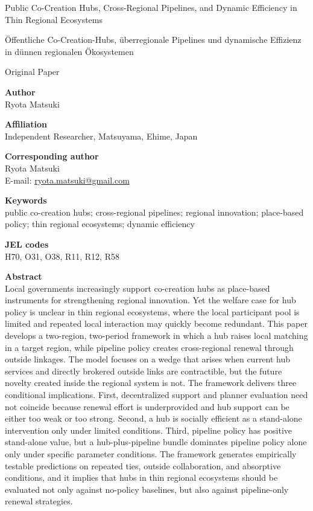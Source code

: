 \documentclass[12pt]{article}
\begin{document}
\begin{center}
{\Large Public Co-Creation Hubs, Cross-Regional Pipelines, and Dynamic Efficiency in Thin Regional Ecosystems\par}
\vspace{0.5em}
{\large \"{O}ffentliche Co-Creation-Hubs, \"uberregionale Pipelines und dynamische Effizienz in d\"unnen regionalen \"Okosystemen\par}
\vspace{1em}
{\normalsize Original Paper\par}
\end{center}

\textbf{Author}\\
Ryota Matsuki

\textbf{Affiliation}\\
Independent Researcher, Matsuyama, Ehime, Japan

\textbf{Corresponding author}\\
Ryota Matsuki\\
E-mail: \href{mailto:ryota.matsuki@gmail.com}{ryota.matsuki@gmail.com}

\textbf{Keywords}\\
public co-creation hubs; cross-regional pipelines; regional innovation; place-based policy; thin regional ecosystems; dynamic efficiency

\textbf{JEL codes}\\
H70, O31, O38, R11, R12, R58

\textbf{Abstract}\\
Local governments increasingly support co-creation hubs as place-based instruments for strengthening regional innovation. Yet the welfare case for hub policy is unclear in thin regional ecosystems, where the local participant pool is limited and repeated local interaction may quickly become redundant. This paper develops a two-region, two-period framework in which a hub raises local matching in a target region, while pipeline policy creates cross-regional renewal through outside linkages. The model focuses on a wedge that arises when current hub services and directly brokered outside links are contractible, but the future novelty created inside the regional system is not. The framework delivers three conditional implications. First, decentralized support and planner evaluation need not coincide because renewal effort is underprovided and hub support can be either too weak or too strong. Second, a hub is socially efficient as a stand-alone intervention only under limited conditions. Third, pipeline policy has positive stand-alone value, but a hub-plus-pipeline bundle dominates pipeline policy alone only under specific parameter conditions. The framework generates empirically testable predictions on repeated ties, outside collaboration, and absorptive conditions, and it implies that hubs in thin regional ecosystems should be evaluated not only against no-policy baselines, but also against pipeline-only renewal strategies.
\end{document}
